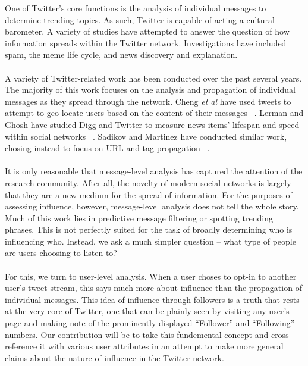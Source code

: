 One of Twitter's core functions is the analysis of individual messages to determine trending topics.  As such, Twitter is capable of acting a cultural barometer.  A variety of studies have attempted to answer the question of how information spreads within the Twitter network.  Investigations have included spam, the meme life cycle, and news discovery and explanation.\\\\
A variety of Twitter-related work has been conducted over the past several years.  The majority of this work focuses on the analysis and propagation of individual messages as they spread through the network.  Cheng \textit{et al} have used tweets to attempt to geo-locate users based on the content of their messages ~\cite{CCL10}.  Lerman and Ghosh have studied Digg and Twitter to measure news items' lifespan and speed within social networks ~\cite{LG10}.  Sadikov and Martinez have conducted similar work, chosing instead to focus on URL and tag propagation ~\cite{SM09}.\\\\
It is only reasonable that message-level analysis has captured the attention of the research community.  After all, the novelty of modern social networks is largely that they are a new medium for the spread of information.  For the purposes of assessing influence, however, message-level analysis does not tell the whole story.  Much of this work lies in predictive message filtering or spotting trending phrases.  This is not perfectly suited for the task of broadly determining who is influencing who.  Instead, we ask a much simpler question -- what type of people are users choosing to listen to?\\\\
For this, we turn to user-level analysis.  When a user choses to opt-in to another user's tweet stream, this says much more about influence than the propagation of individual messages.  This idea of influence through followers is a truth that rests at the very core of Twitter, one that can be plainly seen by visiting any user's page and making note of the prominently displayed ``Follower'' and ``Following'' numbers.  Our contribution will be to take this fundemental concept and cross-reference it with various user attributes in an attempt to make more general claims about the nature of influence in the Twitter network.\\\\